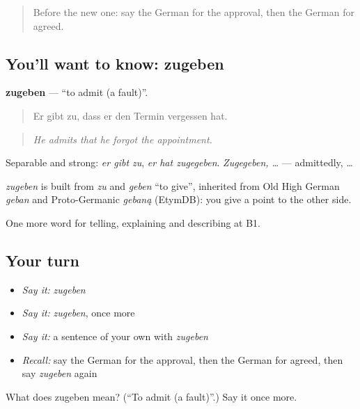 \label{lesson:GE-C334-zugeben}



\begin{quote}
Before the new one: say the German for the approval, then the German for agreed.
\end{quote}

\subsection*{You'll want to know: zugeben}
\textbf{zugeben} — \textquotedblleft{}to admit (a fault)\textquotedblright{}.

\begin{quote}
Er gibt zu, dass er den Termin vergessen hat.
\end{quote}

\begin{quote}
\emph{He admits that he forgot the appointment.}
\end{quote}

Separable and strong: \emph{er gibt zu}, \emph{er hat zugegeben}. \emph{Zugegeben, …} — admittedly, …

\begin{cousinweb}
\emph{zugeben} is built from \emph{zu} and \emph{geben} \textquotedblleft{}to give\textquotedblright{}, inherited from Old High German \emph{geban} and Proto-Germanic \emph{gebaną} (EtymDB): you give a point to the other side.
\end{cousinweb}

\begin{grammarlens}[title={What you've built}]
One more word for telling, explaining and describing at B1.
\end{grammarlens}

\subsection*{Your turn}
\begin{itemize}
\raggedright
  \item \emph{Say it:} \emph{zugeben}
  \item \emph{Say it:} \emph{zugeben}, once more
  \item \emph{Say it:} a sentence of your own with \emph{zugeben}
  \item \emph{Recall:} say the German for the approval, then the German for agreed, then say \emph{zugeben} again
\end{itemize}

\begin{tcolorbox}[breakable,colback=teal!4,colframe=teal!35!black,title={Before you move on}]
What does zugeben mean? (\textquotedblleft{}To admit (a fault)\textquotedblright{}.) Say it once more.
\end{tcolorbox}
